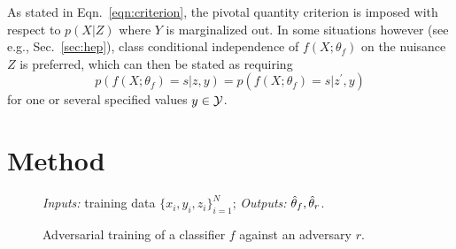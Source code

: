 \documentclass{article}
\theoremstyle{plain}
\begin{document}
As stated in Eqn.~\ref{eqn:criterion}, the pivotal quantity criterion is
imposed with respect to $p(X|Z)$ where $Y$ is marginalized out. In some situations
however (see e.g., Sec.~\ref{sec:hep}), class conditional independence of $f(X;
\theta_f)$ on the nuisance $Z$ is preferred, which can then be stated as
requiring
\begin{equation}\label{eqn:criterion-class}
    p(f(X ; \theta_f) = s | z, y ) = p(f(X ; \theta_f) = s | z^\prime, y )
\end{equation}
for one or several specified values $y \in {\cal Y}$.



\section{Method}
\label{sec:method}

\begin{figure*}
    \begin{minipage}{\linewidth}
    \begin{algorithm}[H]
    \caption{Adversarial training of a classifier $f$ against an adversary $r$.}

    {\footnotesize
    \begin{flushleft}
        {\it Inputs:} training data $\{ x_i, y_i, z_i \}_{i=1}^N$;
        {\it Outputs:} $\smash{\hat\theta_f}, \smash{\hat\theta_r}$.
    \end{flushleft}

    \label{alg:adversarial-training}
    \begin{algorithmic}[1]
            \ENDFOR
        \ENDFOR
    \end{algorithmic}
    }
    \end{algorithm}
    \end{minipage}
\end{figure*}
\end{document}
